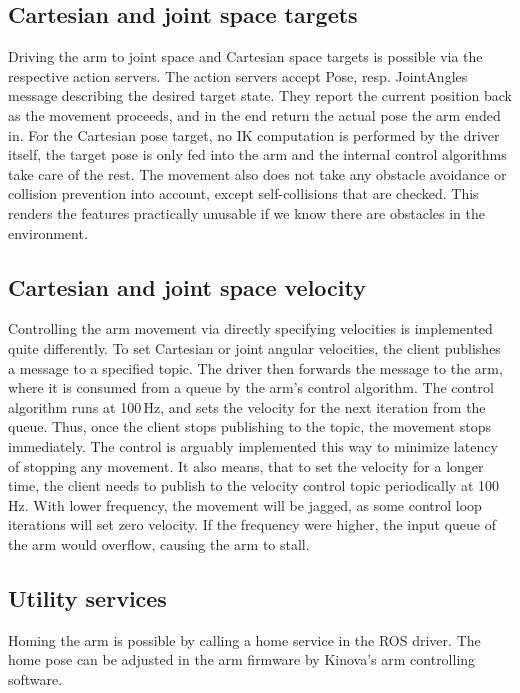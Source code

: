 \documentclass[buriama8_dp.tex]{subfiles}
\begin{document}
\subsection{Cartesian and joint space targets}
\label{subsec:api_cart_action}

Driving the arm to joint space and Cartesian space targets is possible via the respective action servers. The action servers accept Pose, resp. JointAngles message describing the desired target state. They report the current position back as the movement proceeds, and in the end return the actual pose the arm ended in. For the Cartesian pose target, no IK computation is performed by the driver itself, the target pose is only fed into the arm and the internal control algorithms take care of the rest. The movement also does not take any obstacle avoidance or collision prevention into account, except self-collisions that are checked. This renders the features practically unusable if we know there are obstacles in the environment.

\subsection{Cartesian and joint space velocity}
\label{subsec:api_cart_vel}

Controlling the arm movement via directly specifying velocities is implemented quite differently. To set Cartesian or joint angular velocities, the client publishes a message to a specified topic. The driver then forwards the message to the arm, where it is consumed from a queue by the arm's control algorithm. The control algorithm runs at 100\,Hz, and sets the velocity for the next iteration from the queue. Thus, once the client stops publishing to the topic, the movement stops immediately. The control is arguably implemented this way to minimize latency of stopping any movement. It also means, that to set the velocity for a longer time, the client needs to publish to the velocity control topic periodically at 100\,Hz. With lower frequency, the movement will be jagged, as some control loop iterations will set zero velocity. If the frequency were higher, the input queue of the arm would overflow, causing the arm to stall.

\subsection{Utility services}
\label{subsec:api_util}

Homing the arm is possible by calling a home service in the ROS driver. The home pose can be adjusted in the arm firmware by Kinova's arm controlling software.
\end{document}
